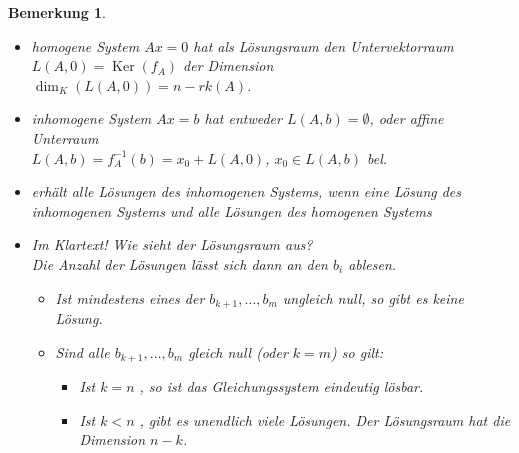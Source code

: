 \documentclass[ngerman,a4paper]{report}
\theoremstyle{changebreak}
\newtheorem{remark}[theorem]{Bemerkung}
\DeclareMathOperator{\Ker}{Ker}
\begin{document}
\begin{remark}
    \begin{itemize}
    \item homogene System $Ax=0$ hat als Lösungsraum den \emph{Untervektorraum} $L(A,0) = \Ker(f_A)$ der Dimension\\ $\dim_K(L(A,0)) = n - rk(A)$.
    \item inhomogene System $Ax=b$ hat entweder $L(A,b) = \emptyset$, oder \emph{affine Unterraum}\\ $L(A,b) = f_A^{-1}(b) = x_0 + L(A,0)$, $x_0 \in L(A,b)$ bel.
    \item erhält alle Lösungen des inhomogenen Systems, wenn eine Lösung des inhomogenen Systems und alle Lösungen des homogenen Systems
    \item Im Klartext! Wie sieht der Lösungsraum aus?\\
    Die Anzahl der Lösungen lässt sich dann an den $b_i$ ablesen.
        \begin{itemize}
            \item Ist mindestens eines der $b_{k+1},\dotsc ,b_{m}$ ungleich null, so gibt es keine Lösung.
            \item Sind alle $b_{k+1},\dotsc ,b_{m}$ gleich null (oder $k = m$) so gilt:
            \begin{itemize}
                \item Ist $k=n$ , so ist das Gleichungssystem eindeutig lösbar.
                \item Ist $k<n$ , gibt es unendlich viele Lösungen. Der Lösungsraum hat die Dimension $n-k$.
            \end{itemize}
        \end{itemize}
    \end{itemize}
\end{remark}
\end{document}
